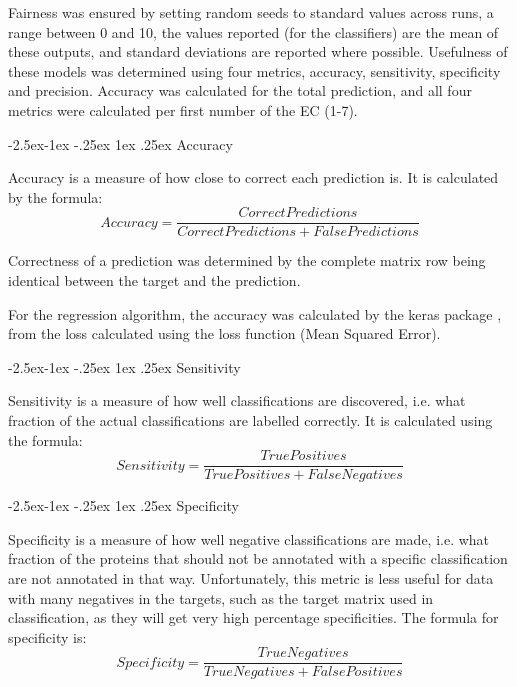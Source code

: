 \documentclass[12pt]{article}
\makeatletter
\renewcommand\paragraph{\@startsection{paragraph}{4}{\z@}
            {-2.5ex\@plus -1ex \@minus -.25ex}
            {1ex \@plus .25ex}
            {\normalfont\normalsize\bfseries}}
\makeatother
\begin{document}
			Fairness was ensured by setting random seeds to standard values across runs, a range between 0 and 10, the values reported (for the classifiers) are the mean of these outputs, and standard deviations are reported where possible.  Usefulness of these models was determined using four metrics, accuracy, sensitivity, specificity and precision.  Accuracy was calculated for the total prediction, and all four metrics were calculated per first number of the EC (1-7).
		
			\paragraph{Accuracy}
			
			Accuracy is a measure of how close to correct each prediction is.  It is calculated by the formula:
			\[Accuracy = \frac{Correct Predictions}{Correct Predictions + False Predictions}\]
			
			Correctness of a prediction was determined by the complete matrix row being identical between the target and the prediction.
			
			For the regression algorithm, the accuracy was calculated by the keras package \citep{RefWorks:doc:5dd5e464e4b029f578dee4d2}, from the loss calculated using the loss function (Mean Squared Error). 
			
			\paragraph{Sensitivity}
			
			Sensitivity is a measure of how well classifications are discovered, i.e. what fraction of the actual classifications are labelled correctly.  It is calculated using the formula: 
			\[Sensitivity = \frac{True Positives}{True Positives + False Negatives}\]
			
			\paragraph{Specificity}
			\label{section:methods:specificity}
			
			Specificity is a measure of how well negative classifications are made, i.e. what fraction of the proteins that should not be annotated with a specific classification are not annotated in that way.  Unfortunately, this metric is less useful for data with many negatives in the targets, such as the target matrix used in classification, as they will get very high percentage specificities.  The formula for specificity is:
			\[Specificity = \frac{True Negatives}{True Negatives + False Positives}\]
			
\end{document}
